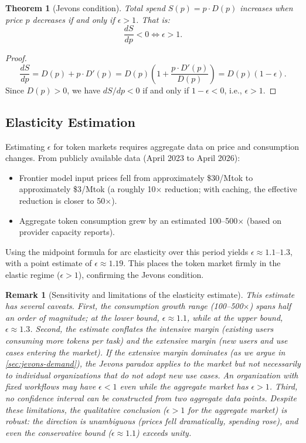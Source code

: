 \documentclass[11pt, a4paper, logo, copyright]{googledeepmind}
\newtheorem{theorem}{Theorem}[section]
\newtheorem*{remark}{Remark}
\begin{document}
\begin{theorem}[Jevons condition]\label{thm:jevons}
Total spend $S(p) = p \cdot D(p)$ increases when price $p$ decreases if and only if $\epsilon > 1$. That is:
\begin{equation}\label{eq:jevons-condition}
    \frac{dS}{dp} < 0 \iff \epsilon > 1.
\end{equation}
\end{theorem}

\begin{proof}
\[
    \frac{dS}{dp} = D(p) + p \cdot D'(p) = D(p)\left(1 + \frac{p \cdot D'(p)}{D(p)}\right) = D(p)(1 - \epsilon).
\]
Since $D(p) > 0$, we have $dS/dp < 0$ if and only if $1 - \epsilon < 0$, i.e., $\epsilon > 1$.
\end{proof}

\subsection{Elasticity Estimation}

Estimating $\epsilon$ for token markets requires aggregate data on price and consumption changes. From publicly available data (April 2023 to April 2026):
\begin{itemize}[nosep]
    \item Frontier model input prices fell from approximately \$30/Mtok to approximately \$3/Mtok (a roughly 10$\times$ reduction; with caching, the effective reduction is closer to 50$\times$).
    \item Aggregate token consumption grew by an estimated 100--500$\times$ (based on provider capacity reports).
\end{itemize}

Using the midpoint formula for arc elasticity over this period yields $\epsilon \approx 1.1$--$1.3$, with a point estimate of $\epsilon \approx 1.19$. This places the token market firmly in the elastic regime ($\epsilon > 1$), confirming the Jevons condition.

\begin{remark}[Sensitivity and limitations of the elasticity estimate]
This estimate has several caveats. First, the consumption growth range (100--500$\times$) spans half an order of magnitude; at the lower bound, $\epsilon \approx 1.1$, while at the upper bound, $\epsilon \approx 1.3$. Second, the estimate conflates the intensive margin (existing users consuming more tokens per task) and the extensive margin (new users and use cases entering the market). If the extensive margin dominates (as we argue in \cref{sec:jevons-demand}), the Jevons paradox applies to the \emph{market} but not necessarily to individual organizations that do not adopt new use cases. An organization with fixed workflows may have $\epsilon < 1$ even while the aggregate market has $\epsilon > 1$. Third, no confidence interval can be constructed from two aggregate data points. Despite these limitations, the qualitative conclusion ($\epsilon > 1$ for the aggregate market) is robust: the direction is unambiguous (prices fell dramatically, spending rose), and even the conservative bound ($\epsilon \approx 1.1$) exceeds unity.
\end{remark}
\end{document}
